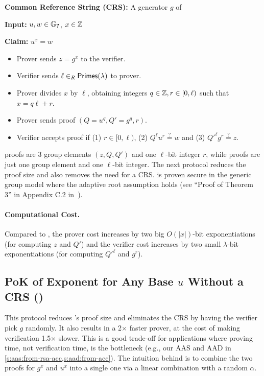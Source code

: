 \noindent \textbf{Common Reference String (CRS):} A generator $g$ of \GroupHidOrd

\noindent \textbf{Input:} $u,w\in \mathbb{G}_{\textbf{?}}$, $x\in \mathbb{Z}$

\noindent \textbf{Claim:} $u^x = w$
\begin{itemize}
\item Prover sends $z = g^x$ to the verifier.
\item Verifier sends $\ell \in_R \mathsf{Primes}(\lambda)$ to prover.
\item Prover divides $x$ by $\ell$, obtaining integers $q\in \mathbb{Z},r\in [0,\ell)$ such that $x = q\ell + r$.
\item Prover sends proof $(Q=u^q,Q'=g^q, r)$.
\item Verifier accepts proof  if (1) $r \in [0, \ell)$, (2) $Q^\ell u^{r} \stackrel{?}{=} w$ and (3) $Q'^\ell g^{r} \stackrel{?}{=} z$.
\end{itemize}

\poke proofs are 3 group elements $(z,Q,Q')$ and one $\ell$-bit integer $r$, while \pokestar proofs are just one group element and one $\ell$-bit integer.
The next \poketwo protocol reduces the proof size and also removes the need for a CRS.
\poke is proven secure in the generic group model where the adaptive root assumption holds (see ``Proof of Theorem 3'' in Appendix C.2 in~\cite{BBF18}).

\paragraph{Computational Cost.}
Compared to \pokestar, the prover cost increases by two big $O(|x|)$-bit exponentiations (for computing $z$ and $Q'$) and the verifier cost increases by two small $\lambda$-bit exponentiations (for computing $Q'^\ell$ and $g^r$).

\subsection{PoK of Exponent for Any Base $u$ Without a CRS (\poketwo)}
This protocol reduces \poke's proof size and eliminates the CRS by having the verifier pick $g$ randomly.
It also results in a 2$\times$ faster prover, at the cost of making verification 1.5$\times$ slower.
This is a good trade-off for applications where proving time, not verification time, is the bottleneck (e.g., our AAS and AAD in \cref{s:aas:from-rsa-acc,s:aad:from-acc}).
The intuition behind \poketwo is to combine the two \pokestar proofs for $g^x$ and $u^x$ into a single one via a linear combination with a random $\alpha$.
\\

